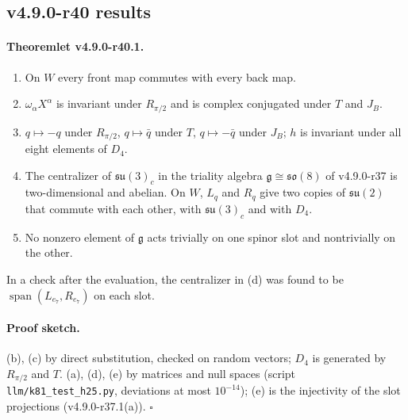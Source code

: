\subsection*{v4.9.0-r40 results}
\label{subsec:v490-r40-results}

\paragraph{Theoremlet v4.9.0-r40.1.}
\begin{enumerate}[leftmargin=2em]
\item[(a)] On \(W\) every front map commutes with every back map.
\item[(b)] \(\omega_\alpha X^\alpha\) is invariant under \(R_{\pi/2}\) and is complex conjugated under \(T\) and \(J_B\).
\item[(c)] \(q\mapsto-q\) under \(R_{\pi/2}\), \(q\mapsto\bar q\) under \(T\), \(q\mapsto-\bar q\) under \(J_B\); \(h\) is invariant under all eight
elements of \(D_4\).
\item[(d)] The centralizer of \(\mathfrak{su}(3)_c\) in the triality algebra \(\mathfrak g\cong\mathfrak{so}(8)\) of v4.9.0-r37 is two-dimensional
and abelian.  On \(W\), \(L_q\) and \(R_q\) give two copies of \(\mathfrak{su}(2)\) that commute with each other, with
\(\mathfrak{su}(3)_c\) and with \(D_4\).
\item[(e)] No nonzero element of \(\mathfrak g\) acts trivially on one spinor slot and nontrivially on the other.
\end{enumerate}
In a check after the evaluation, the centralizer in (d) was found to be \(\operatorname{span}(L_{e_7},R_{e_7})\) on each slot.

\paragraph{Proof sketch.}
(b), (c) by direct substitution, checked on random vectors; \(D_4\) is generated by \(R_{\pi/2}\) and \(T\).  (a), (d), (e) by matrices
and null spaces (script \texttt{llm/k81\_test\_h25.py}, deviations at most \(10^{-14}\)); (e) is the injectivity of the slot projections
(v4.9.0-r37.1(a)).  \(\square\)

